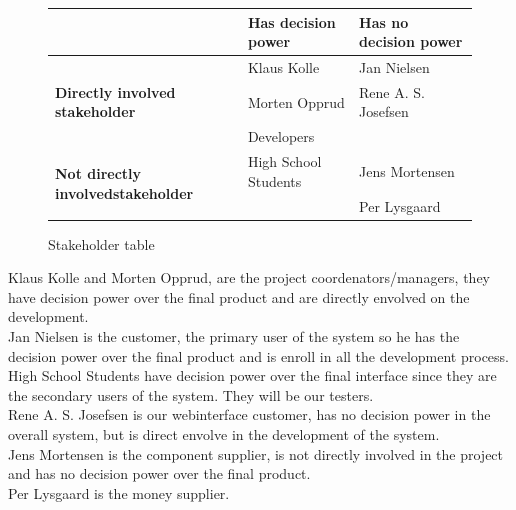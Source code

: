 \begin{figure}[h!]
 \begin{center}
  \begin{tabular}{| l | l | l |}
   \hline
    & \textbf{Has decision power} & \textbf{Has no decision power} \\ \hline
    \multirow{3}{*}{\textbf{Directly involved stakeholder}} 
    	& Klaus Kolle & Jan Nielsen \\ 
    	& Morten Opprud & Rene A. S. Josefsen  \\ 
    	& Developers &  \\ \hline
    \multirow{2}{*}{\textbf{Not directly involvedstakeholder}} 
    	& High School Students & Jens Mortensen\\ 
    	& & Per Lysgaard\\ \hline
   \end{tabular}
  \end{center}
 \caption{Stakeholder table}
\end{figure}

Klaus Kolle and Morten Opprud, are the project coordenators/managers, they
have decision power over the final product and are directly envolved on the
development.\\
\newline
Jan Nielsen is the customer, the primary user of the system so he has the
decision power over the final product and is enroll in all the development
process.\\
\newline
High School Students have decision power over the final interface since they
are the secondary users of the system. They will be our testers.\\
\newline
Rene A. S. Josefsen is our webinterface customer, has no decision power in the
overall system, but is direct envolve in the development of the system.\\
\newline
Jens Mortensen is the component supplier, is not directly involved in the
project and has no decision power over the final product.\\
\newline
Per Lysgaard is the money supplier.\\
\newline

